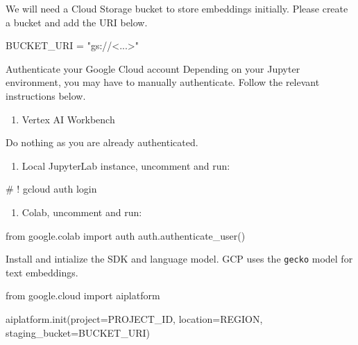 \documentclass[
  letterpaper,
  DIV=11,
  numbers=noendperiod]{scrreprt}
\newenvironment{Shaded}{\begin{snugshade}}{\end{snugshade}}
\newcommand{\CommentTok}[1]{\textcolor[rgb]{0.37,0.37,0.37}{#1}}
\newcommand{\ImportTok}[1]{\textcolor[rgb]{0.00,0.46,0.62}{#1}}
\newcommand{\NormalTok}[1]{\textcolor[rgb]{0.00,0.23,0.31}{#1}}
\newcommand{\OperatorTok}[1]{\textcolor[rgb]{0.37,0.37,0.37}{#1}}
\newcommand{\StringTok}[1]{\textcolor[rgb]{0.13,0.47,0.30}{#1}}
\providecommand{\tightlist}{%
  \setlength{\itemsep}{0pt}\setlength{\parskip}{0pt}}\usepackage{longtable,booktabs,array}
\begin{document}
We will need a Cloud Storage bucket to store embeddings initially.
Please create a bucket and add the URI below.

\begin{Shaded}
\begin{Highlighting}[]
\NormalTok{BUCKET\_URI }\OperatorTok{=} \StringTok{"gs://\textless{}...\textgreater{}"}
\end{Highlighting}
\end{Shaded}

Authenticate your Google Cloud account Depending on your Jupyter
environment, you may have to manually authenticate. Follow the relevant
instructions below.

\begin{enumerate}
\def\labelenumi{\arabic{enumi}.}
\tightlist
\item
  Vertex AI Workbench
\end{enumerate}

Do nothing as you are already authenticated.

\begin{enumerate}
\def\labelenumi{\arabic{enumi}.}
\setcounter{enumi}{1}
\tightlist
\item
  Local JupyterLab instance, uncomment and run:
\end{enumerate}

\begin{Shaded}
\begin{Highlighting}[]
\CommentTok{\# ! gcloud auth login}
\end{Highlighting}
\end{Shaded}

\begin{enumerate}
\def\labelenumi{\arabic{enumi}.}
\setcounter{enumi}{2}
\tightlist
\item
  Colab, uncomment and run:
\end{enumerate}

\begin{Shaded}
\begin{Highlighting}[]
\ImportTok{from}\NormalTok{ google.colab }\ImportTok{import}\NormalTok{ auth}
\NormalTok{auth.authenticate\_user()}
\end{Highlighting}
\end{Shaded}

Install and intialize the SDK and language model. GCP uses the
\texttt{gecko} model for text embeddings.

\begin{Shaded}
\begin{Highlighting}[]
\ImportTok{from}\NormalTok{ google.cloud }\ImportTok{import}\NormalTok{ aiplatform}

\NormalTok{aiplatform.init(project}\OperatorTok{=}\NormalTok{PROJECT\_ID, location}\OperatorTok{=}\NormalTok{REGION, staging\_bucket}\OperatorTok{=}\NormalTok{BUCKET\_URI)}
\end{Highlighting}
\end{Shaded}
\end{document}
